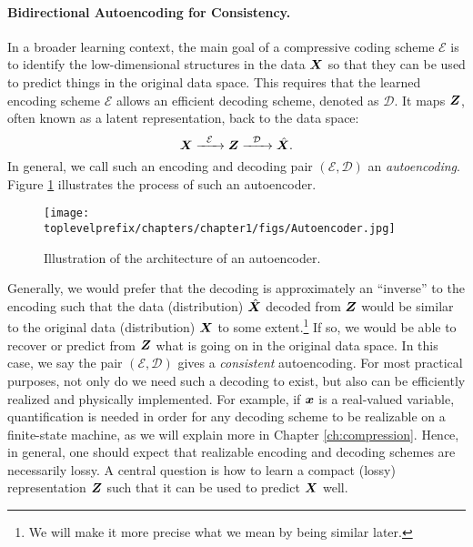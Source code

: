 \documentclass[\toplevelprefix/book-main.tex]{subfiles}
\begin{document}
\paragraph{Bidirectional Autoencoding for Consistency.}
In a broader learning context, the main goal of a compressive coding scheme $\mathcal{E}$ is to identify the low-dimensional structures in the data $\bm{X}$ so that they can be used to predict things in the original data space. This requires that the learned encoding scheme $\mathcal{E}$ allows an efficient decoding scheme, denoted as $\mathcal D$. It maps $\bm{Z}$, often known as a latent representation, back to the data space:
\begin{equation}
    \bm{X}   \xrightarrow{\hspace{2mm} \mathcal{E}\hspace{2mm}} \bm{Z}  \xrightarrow{\hspace{2mm} \mathcal{D} \hspace{2mm}} \hat {\bm{X}}.
       \label{eqn:auto-encoding}
\end{equation}
In general, we call such an encoding and decoding pair $(\mathcal{E}, \mathcal{D})$  an {\em autoencoding}. Figure \ref{fig:autoencoder}
illustrates the process of such an autoencoder. 
\begin{figure}
    \centering
    \texttt{[image: \\toplevelprefix/chapters/chapter1/figs/Autoencoder.jpg]}
    \caption{Illustration of the architecture of an autoencoder. }
    \label{fig:autoencoder}
\end{figure}


Generally, we would prefer that the decoding is approximately an ``inverse'' to the encoding such that the data (distribution) $\hat {\bm{X}}$ decoded from $\bm{Z}$ would be similar to the original data (distribution) $\bm{X}$ to some extent.\footnote{We will make it more precise what we mean by being similar later.} If so, we would be able to recover or predict from $\bm{Z}$ what is going on in the original data space. In this case, we say the pair $(\mathcal{E}, \mathcal{D})$ gives a {\em consistent}  autoencoding. For most practical purposes, not only do we need such a decoding to exist, but also can be efficiently realized and physically implemented. For example, if $\bm{x}$ is a real-valued variable, quantification is needed in order for any decoding scheme to be realizable on a finite-state machine, as we will explain more in Chapter \ref{ch:compression}. Hence, in general, one should expect that realizable encoding and decoding schemes are necessarily lossy. A central question is how to learn a compact (lossy) representation $\bm{Z}$ such that it can be used to predict $\bm{X}$ well.
\end{document}
